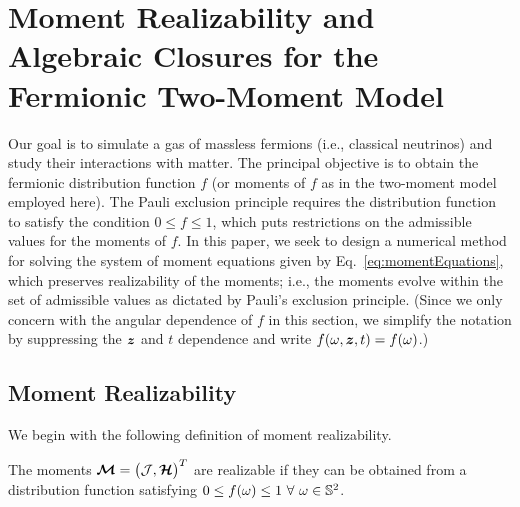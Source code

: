 \section{Moment Realizability and Algebraic Closures for the Fermionic Two-Moment Model}
\label{sec:realizability}

Our goal is to simulate a gas of massless fermions (i.e., classical neutrinos) and study their interactions with matter.  
The principal objective is to obtain the fermionic distribution function $f$ (or moments of $f$ as in the two-moment model employed here).  
The Pauli exclusion principle requires the distribution function to satisfy the condition $0 \le f \le 1$, which puts restrictions on the admissible values for the moments of $f$.  
In this paper, we seek to design a numerical method for solving the system of moment equations given by Eq.~\eqref{eq:momentEquations}, which preserves realizability of the moments; i.e., the moments evolve within the set of admissible values as dictated by Pauli's exclusion principle.  
(Since we only concern with the angular dependence of $f$ in this section, we simplify the notation by suppressing the $\boldsymbol{z}$ and $t$ dependence and write $f(\omega,\boldsymbol{z},t)=f(\omega)$.)  

\subsection{Moment Realizability}

We begin with the following definition of moment realizability.  
\begin{define}
  The moments $\boldsymbol{\mathcal{M}}=\big(\mathcal{J},\boldsymbol{\mathcal{H}}\big)^{T}$ are realizable if they can be obtained from a distribution function satisfying $0\le f(\omega) \le 1~\forall~\omega\in\mathbb{S}^{2}$.
\end{define}

